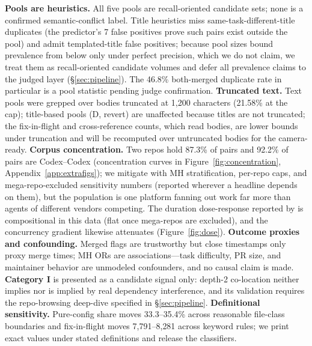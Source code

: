 \documentclass{article}
\begin{document}
\textbf{Pools are heuristics.} All five pools are recall-oriented candidate sets; none is a confirmed semantic-conflict label. Title heuristics miss same-task-different-title duplicates (the predictor's 7 false positives prove such pairs exist outside the pool) and admit templated-title false positives; because pool sizes bound prevalence from below only under perfect precision, which we do not claim, we treat them as recall-oriented candidate volumes and defer all prevalence claims to the judged layer (\S\ref{sec:pipeline}). The 46.8\% both-merged duplicate rate in particular is a pool statistic pending judge confirmation.
\textbf{Truncated text.} Text pools were grepped over bodies truncated at 1{,}200 characters (21.58\% at the cap); title-based pools (D, revert) are unaffected because titles are not truncated; the fix-in-flight and cross-reference counts, which read bodies, are lower bounds under truncation and will be recomputed over untruncated bodies for the camera-ready. %
\textbf{Corpus concentration.} Two repos hold 87.3\% of pairs and 92.2\% of pairs are Codex--Codex (concentration curves in Figure~\ref{fig:concentration}, Appendix~\ref{app:extrafigs}); we mitigate with MH stratification, per-repo caps, and mega-repo-excluded sensitivity numbers (reported wherever a headline depends on them), but the population is one platform fanning out work far more than agents of different vendors competing. The duration dose-response reported by \citet{xu2026agentprs} is compositional in this data (flat once mega-repos are excluded), and the concurrency gradient likewise attenuates (Figure~\ref{fig:dose}). %
\textbf{Outcome proxies and confounding.} Merged flags are trustworthy but close timestamps only proxy merge times; MH ORs are associations---task difficulty, PR size, and maintainer behavior are unmodeled confounders, and no causal claim is made.
\textbf{Category I} is presented as a candidate signal only: depth-2 co-location neither implies nor is implied by real dependency interference, and its validation requires the repo-browsing deep-dive specified in \S\ref{sec:pipeline}.
\textbf{Definitional sensitivity.} Pure-config share moves 33.3--35.4\% across reasonable file-class boundaries and fix-in-flight moves 7{,}791--8{,}281 across keyword rules; we print exact values under stated definitions and release the classifiers. %
\end{document}
